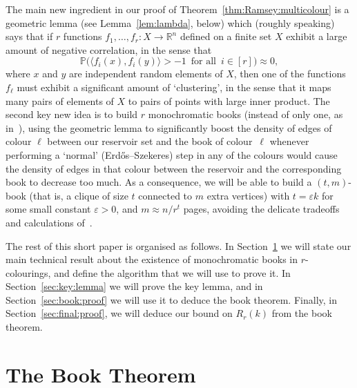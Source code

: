 \documentclass[12pt,reqno]{amsart}
\theoremstyle{definition}
\theoremstyle{remark}
\newcommand\R{\mathbb{R}}
\def\Pr{\mathbb{P}}
\newcommand\eps{\varepsilon}
\renewcommand{\to}{\rightarrow}
\def\eps{\varepsilon}
\def\R{\mathbb{R}}
\def\<{\langle}
\def\>{\rangle}
\begin{document}
The main new ingredient in our proof of Theorem~\ref{thm:Ramsey:multicolour} %
is a geometric lemma (see Lemma~\ref{lem:lambda}, below) which (roughly speaking) says that if $r$ functions $f_1,\ldots,f_r \colon X \to \R^n$ defined on a finite set $X$ exhibit a large amount of negative correlation, in the sense that 
$$\Pr\Big( \big\< f_i(x), f_i(y) \big\> > - 1 \,\text{ for all }\, i \in [r] \Big) \approx 0,$$
where $x$ and $y$ are independent random elements of $X$, then one of the functions $f_\ell$ must exhibit a significant amount of `clustering', in the sense that it maps many pairs of elements of $X$ to pairs of points with large inner product. The second key new idea is to build $r$ monochromatic books (instead of only one, as in~\cite{CGMS}), using the geometric lemma to significantly boost the density of edges of colour $\ell$ between our reservoir set and the book of colour~$\ell$ whenever performing a `normal' (Erd\H{o}s--Szekeres) step in any of the colours would cause the density of edges in that colour between the reservoir and the corresponding book to decrease too much. As a consequence, we will be able to build a $(t,m)$-book (that is, a clique of size $t$ connected to $m$ extra vertices) with $t = \eps k$ for some small constant $\eps > 0$, and $m \approx n / r^t$ pages, avoiding the delicate tradeoffs and calculations of~\cite{CGMS}. 

The rest of this short paper is organised as follows. In Section~\ref{sec:book:thm} we will state our main technical result about the existence of monochromatic books in $r$-colourings, and define the algorithm that we will use to prove it. In Section~\ref{sec:key:lemma} we will prove the key lemma, and in Section~\ref{sec:book:proof} we will use it to deduce the book theorem. Finally, in Section~\ref{sec:final:proof}, we will deduce our bound on $R_r(k)$ from the book theorem.   




\section{The Book Theorem}\label{sec:book:thm}
\end{document}
